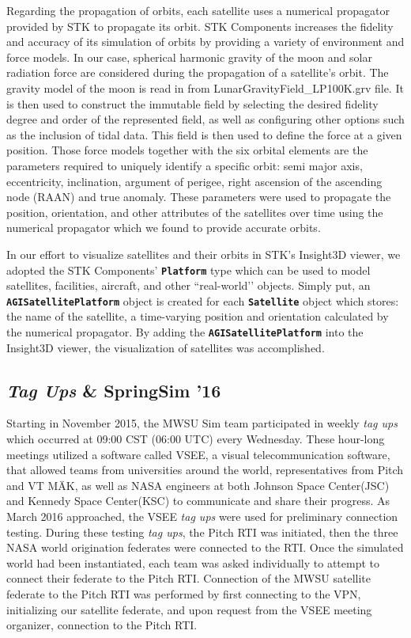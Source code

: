 \documentclass[conference]{IEEEtran}
\newcommand\uml[1]{\texttt{\textbf{#1}}}
\begin{document}
Regarding the propagation of orbits, each satellite uses a numerical propagator provided by STK to propagate its orbit. STK Components increases the fidelity and accuracy of its simulation of orbits by providing a variety of environment and force models. In our case, spherical harmonic gravity of the moon and solar radiation force are considered during the propagation of a satellite\rq{}s orbit. The gravity model of the moon is read in from LunarGravityField\_LP100K.grv file. It is then used to construct the immutable field by selecting the desired fidelity degree and order of the represented field, as well as configuring other options such as the inclusion of tidal data. This field is then used to define the force at a given position. Those force models together with the six orbital elements are the parameters required to uniquely identify a specific orbit: semi major axis, eccentricity, inclination, argument of perigee, right ascension of the ascending node (RAAN) and true anomaly. These parameters were used to propagate the position, orientation, and other attributes of the satellites over time using the numerical propagator which we found to provide accurate orbits. 

In our effort to visualize satellites and their orbits in STK\rq{}s Insight3D viewer, we adopted the STK Components\rq{} \uml{Platform} type which can be used to model satellites, facilities, aircraft, and other ``real-world\rq\rq{} objects. Simply put, an \uml{AGISatellitePlatform} object is created for each \uml{Satellite} object which stores: the name of the satellite, a time-varying position and orientation calculated by the numerical propagator. By adding the \uml{AGISatellitePlatform} into the Insight3D viewer, the visualization of satellites was accomplished.

\subsection{\textit{Tag Ups} \& SpringSim '16}
Starting in November 2015, the MWSU Sim team participated in weekly \textit{tag ups} which occurred at 09:00 CST (06:00 UTC) every Wednesday.  These hour-long meetings utilized a software called VSEE, a visual telecommunication software, that allowed teams from universities around the world, representatives from Pitch and VT M{\"A}K, as well as NASA engineers at both Johnson Space Center(JSC) and Kennedy Space Center(KSC) to communicate and share their progress.  As March 2016 approached, the VSEE \textit{tag ups} were used for preliminary connection testing. During these testing \textit{tag ups}, the Pitch RTI was initiated, then the three NASA world origination federates were connected to the RTI.  Once the simulated world had been instantiated, each team was asked individually to attempt to connect their federate to the Pitch RTI.  Connection of the MWSU satellite federate to the Pitch RTI was performed by first connecting to the VPN, initializing our satellite federate, and upon request from the VSEE meeting organizer, connection to the Pitch RTI.  
\end{document}
